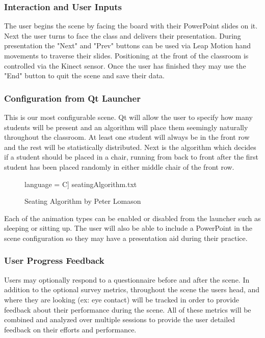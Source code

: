 \documentclass[a4paper,10pt]{article}
\begin{document}
\subsubsection{Interaction and User Inputs}
The user begins the scene by facing the board with their PowerPoint slides on it. Next the user turns to face the class and delivers their presentation. During presentation the "Next" and "Prev" buttons can be used via Leap Motion hand movements to traverse their slides. Positioning at the front of the classroom is controlled via the Kinect sensor. Once the user has finished they may use the "End" button to quit the scene and save their data.

\subsubsection{Configuration from Qt Launcher}
This is our most configurable scene. Qt will allow the user to specify how many students will be present and an algorithm will place them seemingly naturally throughout the classroom. At least one student will always be in the front row and the rest will be statistically distributed. Next is the algorithm which decides if a student should be placed in a chair, running from back to front after the first student has been placed randomly in either middle chair of the front row.

\begin{figure}[H]
	 language = C] {seatingAlgorithm.txt}
	\caption{Seating Algorithm by Peter Lomason}
	\label{code:seatingCode}
\end{figure}

Each of the animation types can be enabled or disabled from the launcher such as sleeping or sitting up. The user will also be able to include a PowerPoint in the scene configuration so they may have a presentation aid during their practice.

\subsubsection{User Progress Feedback}
Users may optionally respond to a questionnaire before and after the scene. In addition to the optional survey metrics, throughout the scene the users head, and where they are looking (ex: eye contact) will be tracked in order to provide feedback about their performance during the scene. All of these metrics will be combined and analyzed over multiple sessions to provide the user detailed feedback on their efforts and performance. 
\end{document}
